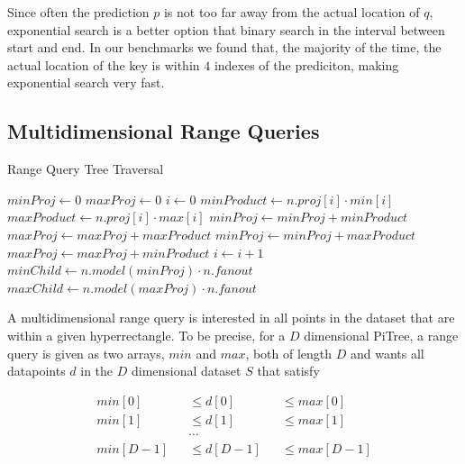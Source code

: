 \documentclass[sigconf,10pt]{acmart}
\begin{document}
Since often the prediction $p$ is not too far away from the actual location
of $q$, exponential search is a better option that binary search in the interval
between start and end. %
In our benchmarks we found that, the majority of the time,
the actual location of the key is within $4$ indexes of the prediciton,
making exponential search very fast. 


\subsection{Multidimensional Range Queries}

\begin{algorithm}
  \caption{Range Query Tree Traversal}
  \label{rqInternal}
    \begin{algorithmic}[1]
    \State {}
    \State \Return{}
    \EndIf
    \State $minProj\gets 0$
    \State $maxProj\gets 0$
    \State $i\gets 0$
    \State $minProduct\gets n.proj[i] \cdot min[i]$
    \State $maxProduct\gets n.proj[i] \cdot max[i]$
    \State $minProj\gets minProj + minProduct$
    \State $maxProj\gets maxProj + maxProduct$
    \Else
    \State $minProj\gets minProj + maxProduct$
    \State $maxProj\gets maxProj + minProduct$
    \EndIf
    \State $i\gets i+1$
    \EndWhile
    \State $minChild \gets n.model(minProj) \cdot n.fanout$
    \State $maxChild \gets n.model(maxProj) \cdot n.fanout$
    \State {}
    \EndFor
    \EndProcedure
  \end{algorithmic}
\end{algorithm}

A multidimensional range query is interested in all points in the 
dataset that are within a given hyperrectangle. To be precise,
for a $D$ dimensional PiTree,
a range query is given as two arrays, $min$ and $max$, both of length $D$
and wants all datapoints $d$ in the $D$ dimensional dataset $S$
that satisfy

\begin{align*}
  min[0] && \leq d[0] && \leq max[0] \\
  min[1] && \leq d[1] && \leq max[1] \\
  && \cdots && \\
  min[D-1] && \leq d[D-1] && \leq max[D-1]
\end{align*}
\end{document}
